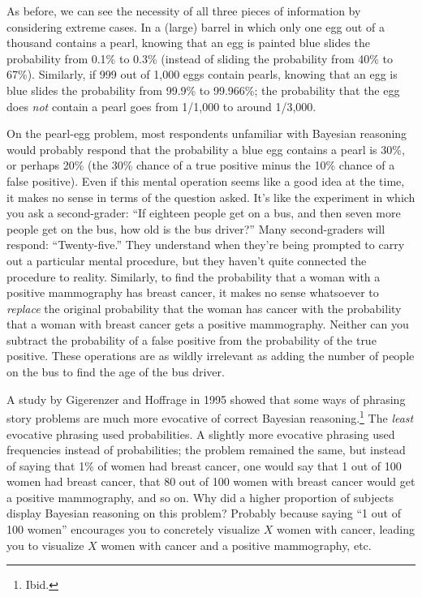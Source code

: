 {{{
 As before, we can see the necessity of all three pieces of
information by considering extreme cases. In a (large) barrel in which
only one egg out of a thousand contains a pearl, knowing that an egg is
painted blue slides the probability from 0.1\% to 0.3\% (instead of
sliding the probability from 40\% to 67\%). Similarly, if 999 out of
1,000 eggs contain pearls, knowing that an egg is blue slides the
probability from 99.9\% to 99.966\%; the probability that the egg does
\textit{not} contain a pearl goes from 1/1,000 to around 1/3,000.}

{
 On the pearl-egg problem, most respondents unfamiliar with
Bayesian reasoning would probably respond that the probability a blue
egg contains a pearl is 30\%, or perhaps 20\% (the 30\% chance of a
true positive minus the 10\% chance of a false positive). Even if this
mental operation seems like a good idea at the time, it makes no sense
in terms of the question asked. It's like the
experiment in which you ask a second-grader: ``If
eighteen people get on a bus, and then seven more people get on the
bus, how old is the bus driver?'' Many second-graders
will respond: ``Twenty-five.'' They
understand when they're being prompted to carry out a
particular mental procedure, but they haven't quite
connected the procedure to reality. Similarly, to find the probability
that a woman with a positive mammography has breast cancer, it makes no
sense whatsoever to \textit{replace} the original probability that the
woman has cancer with the probability that a woman with breast cancer
gets a positive mammography. Neither can you subtract the probability
of a false positive from the probability of the true positive. These
operations are as wildly irrelevant as adding the number of people on
the bus to find the age of the bus driver.}

\hr

{
 A study by Gigerenzer and Hoffrage in 1995 showed that some ways
of phrasing story problems are much more evocative of correct Bayesian
reasoning.\footnote{Ibid.} The \textit{least} evocative phrasing
used probabilities. A slightly more evocative phrasing used frequencies
instead of probabilities; the problem remained the same, but instead of
saying that 1\% of women had breast cancer, one would say that 1 out of
100 women had breast cancer, that 80 out of 100 women with breast
cancer would get a positive mammography, and so on. Why did a higher
proportion of subjects display Bayesian reasoning on this problem?
Probably because saying ``1 out of 100
women'' encourages you to concretely visualize $X$
women with cancer, leading you to visualize $X$ women with cancer and a
positive mammography, etc.}

}}
